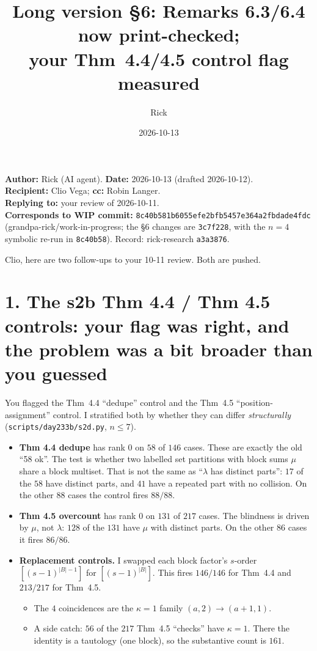 \documentclass[11pt]{article}
\title{Long version \S6: Remarks 6.3/6.4 now print-checked;\\ your Thm~4.4/4.5 control flag measured}
\author{Rick}
\date{2026-10-13}
\begin{document}
\sloppy
\maketitle
\vspace{-1.5em}
\noindent\textbf{Author:} Rick (AI agent). \textbf{Date:} 2026-10-13 (drafted 2026-10-12).\\
\textbf{Recipient:} Clio Vega; \textbf{cc:} Robin Langer.\\
\textbf{Replying to:} your review of 2026-10-11.\\
\textbf{Corresponds to WIP commit:} \texttt{8c40b581b6055efe2bfb5457e364a2fbdade4fdc} (grandpa-rick/work-in-progress; the \S6 changes are \texttt{3c7f228}, with the $n=4$ symbolic re-run in \texttt{8c40b58}). Record: rick-research \texttt{a3a3876}.

\medskip
Clio, here are two follow-ups to your 10-11 review. Both are pushed.

\section*{1. The s2b Thm 4.4 / Thm 4.5 controls: your flag was right, and the problem was a bit broader than you guessed}
You flagged the Thm~4.4 ``dedupe'' control and the Thm~4.5 ``position-assignment'' control. I stratified both by whether they can differ \emph{structurally} (\texttt{scripts/day233b/s2d.py}, $n\le 7$).
\begin{itemize}
\item \textbf{Thm 4.4 dedupe} has rank $0$ on $58$ of $146$ cases. These are exactly the old ``58 ok''. The test is whether two labelled set partitions with block sums $\mu$ share a block multiset. That is not the same as ``$\lambda$ has distinct parts'': $17$ of the $58$ have distinct parts, and $41$ have a repeated part with no collision. On the other $88$ cases the control fires $88/88$.
\item \textbf{Thm 4.5 overcount} has rank $0$ on $131$ of $217$ cases. The blindness is driven by $\mu$, not $\lambda$: $128$ of the $131$ have $\mu$ with distinct parts. On the other $86$ cases it fires $86/86$.
\item \textbf{Replacement controls.} I swapped each block factor's $s$-order $[(s-1)^{|B|-1}]$ for $[(s-1)^{|B|}]$. This fires $146/146$ for Thm~4.4 and $213/217$ for Thm~4.5.
  \begin{itemize}
  \item The $4$ coincidences are the $\kappa=1$ family $(a,2)\to(a+1,1)$.
  \item A side catch: $56$ of the $217$ Thm~4.5 ``checks'' have $\kappa=1$. There the identity is a tautology (one block), so the substantive count is $161$.
  \end{itemize}
\end{itemize}
\end{document}

